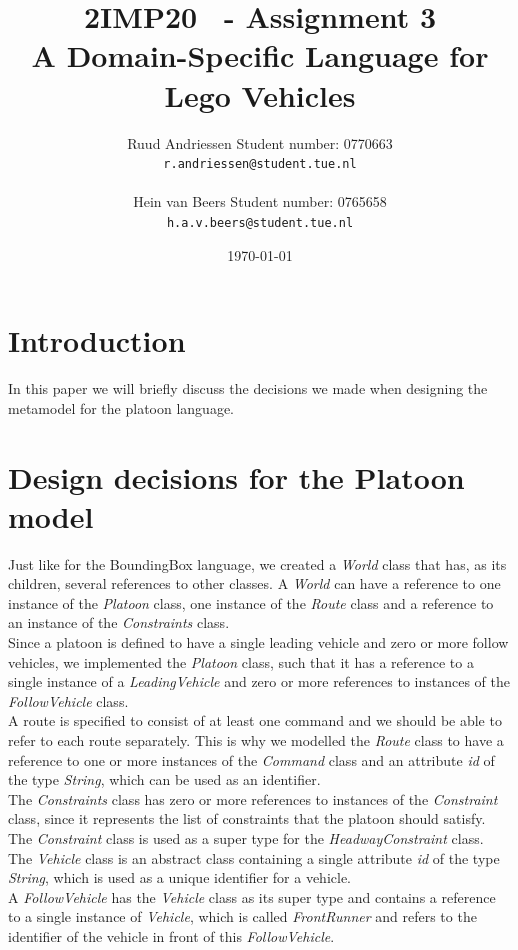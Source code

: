 \documentclass[a4paper,twoside,11pt]{article}
\title{\sffamily\bfseries 2IMP20 \scg\ - Assignment 3\\ A Domain-Specific Language for Lego Vehicles}
\author{Ruud Andriessen \qquad Student number: 0770663\\{\tt r.andriessen@student.tue.nl}\\\\ Hein van Beers \qquad Student number: 0765658 \\{\tt h.a.v.beers@student.tue.nl}}
\date{\today}
\begin{document}
\maketitle
\section{Introduction}
In this paper we will briefly discuss the decisions we made when designing the metamodel for the platoon language.

\section{Design decisions for the Platoon model}
Just like for the BoundingBox language, we created a \textit{World} class that has, as its children, several references to other classes. A \textit{World} can have a reference to one instance of the \textit{Platoon} class, one instance of the \textit{Route} class and a reference to an instance of the \textit{Constraints} class.\\

Since a platoon is defined to have a single leading vehicle and zero or more follow vehicles, we implemented the \textit{Platoon} class, such that it has a reference to a single instance of a \textit{LeadingVehicle} and zero or more references to instances of the \textit{FollowVehicle} class.\\

A route is specified to consist of at least one command and we should be able to refer to each route separately. This is why we modelled the \textit{Route} class to have a reference to one or more instances of the \textit{Command} class and an attribute \textit{id} of the type \textit{String}, which can be used as an identifier.\\

The \textit{Constraints} class has zero or more references to instances of the \textit{Constraint} class, since it represents the list of constraints that the platoon should satisfy. The \textit{Constraint} class is used as a super type for the \textit{HeadwayConstraint} class.\\

The \textit{Vehicle} class is an abstract class containing a single attribute \textit{id} of the type \textit{String}, which is used as a unique identifier for a vehicle.\\

A \textit{FollowVehicle} has the \textit{Vehicle} class as its super type and contains a reference  to a single instance of \textit{Vehicle}, which is called \textit{FrontRunner} and refers to the identifier of the vehicle in front of this \textit{FollowVehicle}.\\
\end{document}
